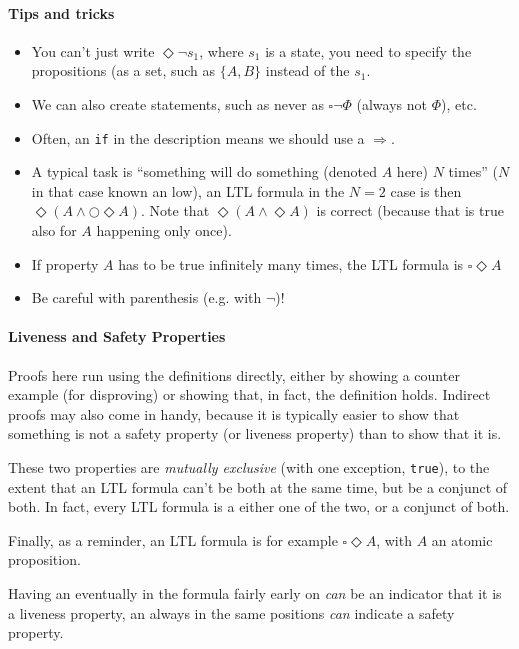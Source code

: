 \paragraph{Tips and tricks}
\begin{itemize}
    \item You can't just write $\Diamond \neg s_1$, where $s_1$ is a state,
          you need to specify the propositions (as a set, such as $\{ A, B \}$ instead of the $s_1$.
    \item We can also create statements, such as never as $\square \neg \Phi$ (always not $\Phi$), etc.
    \item Often, an \texttt{if} in the description means we should use a $\Rightarrow$.
    \item A typical task is ``something will do something (denoted $A$ here) $N$ times'' ($N$ in that case known an low),
          an LTL formula in the $N = 2$ case is then $\Diamond (A \land \bigcirc \Diamond A)$.
          Note that $\Diamond (A \land \Diamond A)$ is  correct (because that is true also for $A$ happening only once).
    \item If property $A$ has to be true infinitely many times, the LTL formula is $\square \Diamond A$
    \item Be careful with parenthesis (e.g. with $\neg$)!
\end{itemize}


\paragraph{Liveness and Safety Properties}
Proofs here run using the definitions directly, either by showing a counter example (for disproving) or showing that, in fact, the definition holds.
Indirect proofs may also come in handy, because it is typically easier to show that something is not a safety property (or liveness property) than to show that it is.

These two properties are \textit{mutually exclusive} (with one exception, \texttt{true}), to the extent that an LTL formula can't be both at the same time, but be a conjunct of both.
In fact, every LTL formula is a either one of the two, or a conjunct of both.

Finally, as a reminder, an LTL formula is for example $\square \Diamond A$, with $A$ an atomic proposition.

Having an eventually in the formula fairly early on \textit{can} be an indicator that it is a liveness property,
an always in the same positions \textit{can} indicate a safety property.
